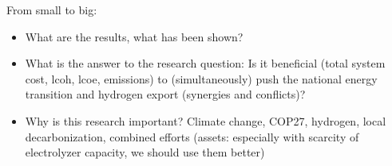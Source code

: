 From small to big:
\begin{itemize}
    \item What are the results, what has been shown?
    \item What is the answer to the research question: Is it beneficial (total system cost, lcoh, lcoe, emissions)
    to (simultaneously) push the national energy transition
    and hydrogen export (synergies and conflicts)?
    \item Why is this research important? Climate change, COP27, hydrogen, local decarbonization, combined efforts (assets: especially with scarcity of electrolyzer capacity, we should use them better)
\end{itemize}
